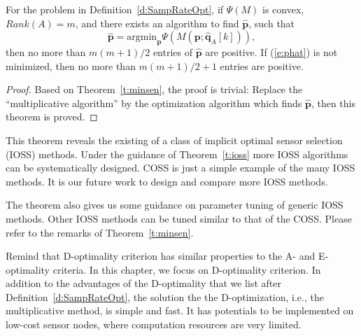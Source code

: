 \begin{thm}\label{t:ioss}
For the problem in Definition~\ref{d:SampRateOpt}, if $\Psi(M)$ is convex, $Rank(A)=m$, and there exists an algorithm to find $\hat{\mathbf{p}}$, such that
\begin{equation}\label{e:phat}
\hat{\mathbf{p}} =\mathrm{argmin}_\mathbf{p} \Psi(M(\mathbf{p}; \hat{\mathbf{q}}_A[k])),     \end{equation}
then no more than $m(m+1)/2$ entries of $\hat{\mathbf{p}}$ are positive. If (\ref{e:phat}) is not minimized, then no more than $m(m+1)/2+1$ entries are positive.
\end{thm}
\begin{proof}
Based on Theorem~\ref{t:minsen}, the proof is trivial: Replace the ``multiplicative algorithm'' by the optimization algorithm which finds $\hat{\mathbf{p}}$, then this theorem is proved.
\end{proof}
\begin{remark}
This theorem reveals the existing of a class of implicit optimal sensor selection (IOSS) methods. Under the guidance of Theorem~\ref{t:ioss} more IOSS algorithms can be systematically designed. COSS is just a simple example of the many IOSS methods. It is our future work to design and compare more IOSS methods.

The theorem also gives us some guidance on parameter tuning of generic IOSS methods. Other IOSS methods can be tuned similar to that of the COSS. Please refer to the remarks of Theorem~\ref{t:minsen}.
\end{remark}

%

Remind that D-optimality criterion has similar properties to the A- and E-optimality criteria.
    In this chapter, we focus on D-optimality criterion. In addition to the advantages of the D-optimality that we list after Definition~\ref{d:SampRateOpt}, the solution the the D-optimization, i.e., the multiplicative method, is simple and fast. It has potentials to be implemented on low-cost sensor nodes, where computation resources are very limited.

